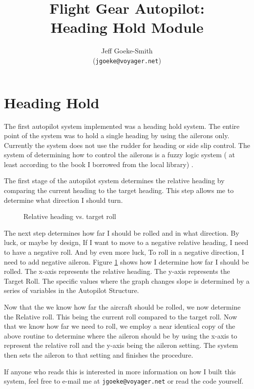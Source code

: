 \documentclass[12pt]{article}
\begin{document}
\title{
  Flight Gear Autopilot: \\
  Heading Hold Module
}


\author{
    Jeff Goeke-Smith \\ 
    (\texttt{jgoeke@voyager.net})
}


\maketitle

\section{Heading Hold}

The first autopilot system implemented was a heading hold system. The
entire point of the system was to hold a single heading by using the
ailerons only.  Currently the system does not use the rudder for
heading or side slip control.  The system of determining how to
control the ailerons is a fuzzy logic system ( at least according to
the book I borrowed from the local library) .

The first stage of the autopilot system determines the relative
heading by comparing the current heading to the target heading.  This
step allows me to determine what direction I should turn.


\begin{figure}[hbt]
  \centerline{                   
  }
  \caption{Relative heading vs. target roll}
  \label{fig:headinghold}
\end{figure}


The next step determines how far I should be rolled and in what
direction.  By luck, or maybe by design, If I want to move to a
negative relative heading, I need to have a negative roll. And by even
more luck, To roll in a negative direction, I need to add negative
aileron.  Figure \ref{fig:headinghold} shows how I determine how far I
should be rolled.  The x-axis represents the relative heading.  The
y-axis represents the Target Roll.  The specific values where the
graph changes slope is determined by a series of variables in the
Autopilot Structure.




Now that the we know how far the aircraft should be rolled, we now
determine the Relative roll. This being the current roll compared to
the target roll.  Now that we know how far we need to roll, we employ
a near identical copy of the above routine to determine where the
aileron should be by using the x-axis to represent the relative roll
and the y-axis being the aileron setting.  The system then sets the
aileron to that setting and finishes the procedure.

If anyone who reads this is interested in more information on how I
built this system, feel free to e-mail me at
\texttt{jgoeke@voyager.net} or read the code yourself.
\end{document}
